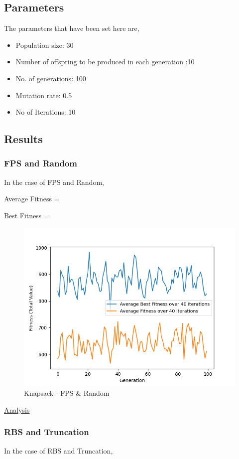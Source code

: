 \documentclass[11pt, letterpaper]{article}
\begin{document}
\subsection{Parameters}
The parameters that have been set here are,
\begin{itemize}
    \item Population size: 30
    \item Number of offspring to be produced in each generation :10
    \item No. of generations: 100
    \item Mutation rate: 0.5
    \item No of Iterations: 10
\end{itemize}
\subsection{Results} 
\subsubsection {FPS and Random}
In the case of FPS and Random,

Average Fitness =

Best Fitness = 
\begin{figure}[H]
    \centering
    \includegraphics[scale = 0.6]{images/knapsack_fp_rd.png}
    \caption {Knapsack - FPS \& Random}
    \label {fig:kpFR}
\end{figure}
\underline{Analysis}
\subsubsection {RBS and Truncation}
In the case of RBS and Truncation,
\end{document}
